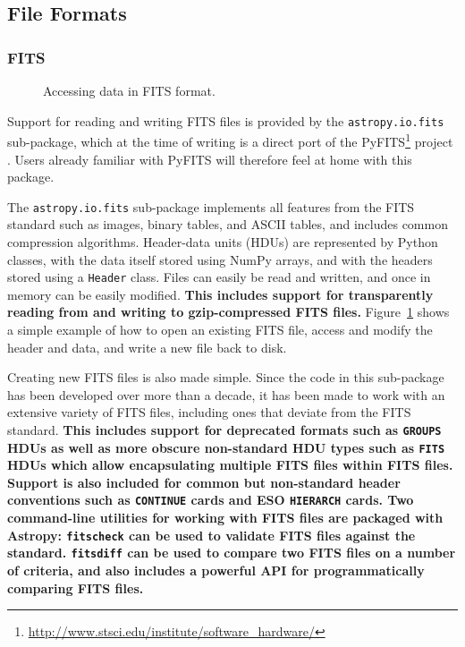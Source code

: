\documentclass[traditabstract]{aa}
\begin{document}
\subsection{File Formats}

\label{sec:io}

\subsubsection{FITS}


\label{sec:fits}

\begin{figure}
\center
\caption{Accessing data in FITS format.\label{code:fits}}
\vspace{0.1in}
\end{figure}

Support for reading and writing FITS files is provided by the
\texttt{astropy.io.fits} sub-package, which at the time of writing is a direct
port of the
PyFITS\footnote{\url{http://www.stsci.edu/institute/software_hardware/}}
project \citep{barrett1999pyfits}. Users already familiar with PyFITS will
therefore feel at home with this package.

The \texttt{astropy.io.fits} sub-package implements all features from the FITS
standard \citep{fits3} such as images, binary tables, and ASCII tables, and
includes common compression algorithms. Header-data units (HDUs) are
represented by Python classes, with the data itself stored using NumPy arrays,
and with the headers stored using a \texttt{Header} class. Files can easily be
read and written, and once in memory can be easily modified. \textbf{This
includes support for transparently reading from and writing to gzip-compressed
FITS files.}
Figure~\ref{code:fits} shows a simple example of how to open an existing FITS
file, access and modify the header and data, and write a new file back to disk.

Creating new FITS files is also made simple. Since the code in this sub-package
has been developed over more than a decade, it has been made to work with an
extensive variety of FITS files, including ones that deviate from the FITS
standard. \textbf{This includes support for deprecated formats such as
\texttt{GROUPS} HDUs as well as more obscure non-standard HDU types such as
\texttt{FITS} HDUs which allow encapsulating multiple FITS files within FITS
files. Support is also included for common but non-standard header conventions
such as \texttt{CONTINUE} cards and ESO \texttt{HIERARCH} cards.  Two
command-line utilities for working with FITS files are packaged with Astropy:
\texttt{fitscheck} can be used to validate FITS files against the standard.
\texttt{fitsdiff} can be used to compare two FITS files on a number of
criteria, and also includes a powerful API for programmatically comparing FITS
files.}
\end{document}
